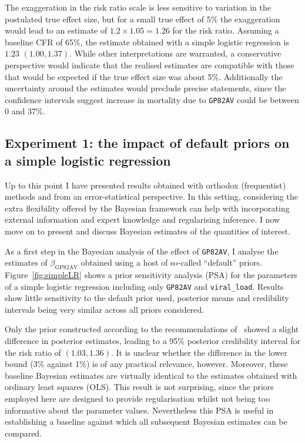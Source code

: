 The exaggeration in the risk ratio scale is less sensitive to variation in the postulated true effect size, but for a small true effect of 5\% the exaggeration would lead to an estimate of $ 1.2 \times 1.05 = 1.26$ for the risk ratio.
Assuming a baseline CFR of 65\%, the estimate obtained with a simple logistic regression is $1.23$ $(1.00, 1.37)$.
While other interpretations are warranted, a conservative perspective would indicate that the realised estimates are compatible with those that would be expected if the true effect size was about 5\%.
Additionally the uncertainty around the estimates would preclude precise statements, since the confidence intervals suggest increase in mortality due to \verb|GP82AV| could be between $0$ and $37$\%.

\subsection{Experiment 1: the impact of default priors on a simple logistic regression}
\label{sec:results-simple}

Up to this point I have presented results obtained with orthodox (frequentist) methods and from an error-statistical perspective.
In this setting, considering the extra flexibility offered by the Bayesian framework can help with incorporating external information and expert knowledge and regularising inference.
I now move on to present and discuss Bayesian estimates of the quantities of interest.

As a first step in the Bayesian analysis of the effect of \verb|GP82AV|, I analyse the estimates of $\beta_{\text{GP82AV}}$ obtained using a host of so-called ``default'' priors.
Figure~\ref{fig:simpleLR} shows a prior sensitivity analysis (PSA) for the parameters of a simple logistic regression including only \verb|GP82AV| and \verb|viral_load|.
Results show little sensitivity to the default prior used, posterior means and credibility intervals  being very similar across all priors considered.

Only the prior constructed according to the recommendations of~\cite{Seaman2012} showed a slight difference in posterior estimates, leading to a 95\% posterior credibility interval for the risk ratio of $(1.03, 1.36)$.
It is unclear whether the difference in the lower bound (3\% against 1\%) is of any practical relevance, however.
Moreover, these baseline Bayesian estimates are virtually identical to the estimates obtained with ordinary least squares (OLS).
This result is not surprising, since the priors employed here are designed to provide regularisation whilst not being too informative about the parameter values.
Nevertheless this PSA is useful in establishing a baseline against which all subsequent Bayesian estimates can be compared.

